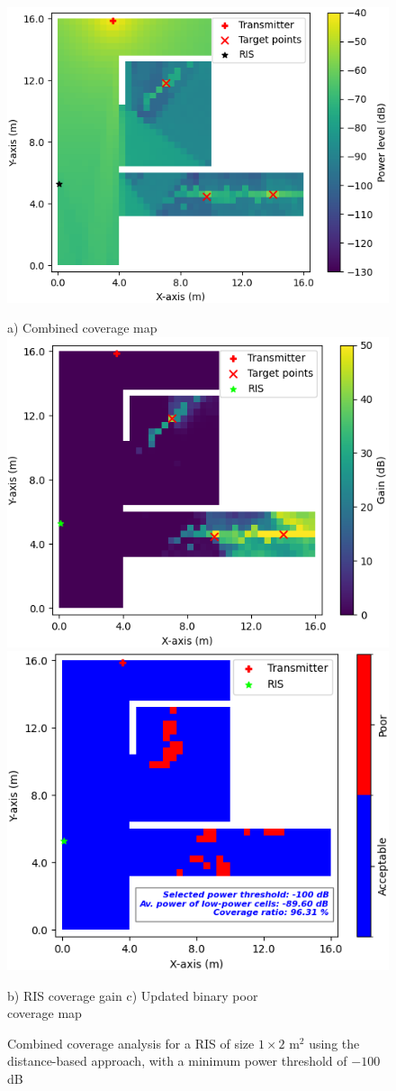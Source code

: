 \documentclass{IEEEoj}
\begin{document}
\begin{figure}
	\centering
	\includegraphics[width=0.7\linewidth]{Sim_Results/Comb_cov_1x2_Distance.png}
	
	a) Combined coverage map \\[5pt]
	
	\includegraphics[width=0.49\linewidth]{Sim_Results/RIS_cov_gain_1x2_Distance.png}
	\hfill
	\includegraphics[width=0.48\linewidth]{Sim_Results/New_Binary_Cov_Map_1x2_Distance.png}
	
	\hspace{10pt} b) RIS coverage gain \hspace{30pt} c) Updated binary poor \\ \hspace{140pt} coverage map
	\caption{Combined coverage analysis for a RIS of size $1 \times 2$ m$^2$ using the distance-based approach, with a minimum power threshold of $-100$ dB}
	\label{comb_cov_distance}
\end{figure}
\end{document}
